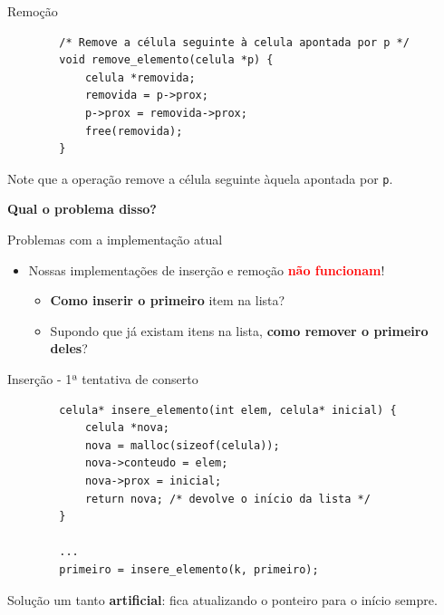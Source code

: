 \documentclass{beamer}
\newcommand{\cod}[1]{\texttt{#1}}
\newcommand{\textcolortwo}[2]{\textcolor{#1}{#2}}
\newcommand{\textred}[1]{\textcolortwo{red}{#1}}
\newcommand{\textbred}[1]{\textbf{\textred{#1}}}
\begin{document}
\begin{frame}[fragile]{Remoção}

    \begin{verbatim}
        /* Remove a célula seguinte à celula apontada por p */
        void remove_elemento(celula *p) {
            celula *removida;
            removida = p->prox;
            p->prox = removida->prox;
            free(removida);
        }
    \end{verbatim}

    Note que a operação remove a célula seguinte àquela apontada por \cod{p}.

    \pause
    \textbf{Qual o problema disso?}

\end{frame}

\begin{frame}[fragile]{Problemas com a implementação atual}

    \begin{itemize}
        \item Nossas implementações de inserção e remoção \textbred{não funcionam}!
        \begin{itemize}
            \item \textbf{Como inserir o primeiro} item na lista?
            \item Supondo que já existam itens na lista, \textbf{como remover o primeiro deles}?
        \end{itemize}
    \end{itemize}

\end{frame}

\begin{frame}[fragile]{Inserção - 1ª tentativa de conserto}

    \begin{verbatim}
        celula* insere_elemento(int elem, celula* inicial) {
            celula *nova;
            nova = malloc(sizeof(celula));
            nova->conteudo = elem;
            nova->prox = inicial;
            return nova; /* devolve o inı́cio da lista */
        }

        ...
        primeiro = insere_elemento(k, primeiro);
    \end{verbatim}

    Solução um tanto \textbf{artificial}: fica atualizando o ponteiro para o início sempre.
\end{frame}
\end{document}
